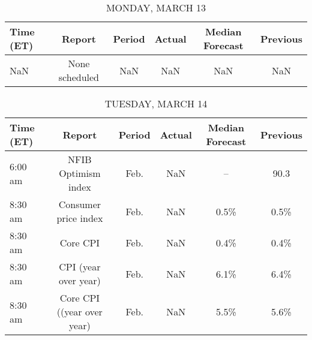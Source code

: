 \documentclass{article}%
\begin{document}
%
\normalsize%


\begin{table}[htbp]%
\caption{MONDAY, MARCH 13}%
\centering%
\begin{adjustbox}{width=1\textwidth}%
\begin{tabular}{lccccc}
\toprule
Time (ET) &         Report & Period & Actual & Median Forecast & Previous \\
\midrule
      NaN & None scheduled &    NaN &    NaN &             NaN &      NaN \\
\bottomrule
\end{tabular}
%
\end{adjustbox}%
\end{table}

%


\begin{table}[htbp]%
\caption{TUESDAY, MARCH 14}%
\centering%
\begin{adjustbox}{width=1\textwidth}%
\begin{tabular}{lccccc}
\toprule
Time (ET) &                     Report & Period & Actual & Median Forecast & Previous \\
\midrule
  6:00 am &        NFIB Optimism index &   Feb. &    NaN &              -- &     90.3 \\
  8:30 am &       Consumer price index &   Feb. &    NaN &            0.5\% &     0.5\% \\
  8:30 am &                   Core CPI &   Feb. &    NaN &            0.4\% &     0.4\% \\
  8:30 am &       CPI (year over year) &   Feb. &    NaN &            6.1\% &     6.4\% \\
  8:30 am & Core CPI ((year over year) &   Feb. &    NaN &            5.5\% &     5.6\% \\
\bottomrule
\end{tabular}
%
\end{adjustbox}%
\end{table}

%
\end{document}
